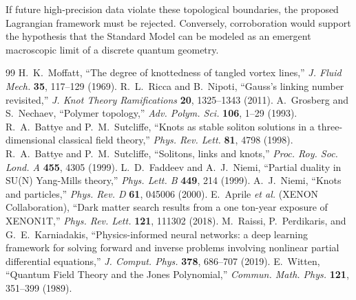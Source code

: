 \documentclass[12pt,a4paper]{article}
\begin{document}
If future high‑precision data violate these topological boundaries, the proposed Lagrangian framework must be rejected. Conversely, corroboration would support the hypothesis that the Standard Model can be modeled as an emergent macroscopic limit of a discrete quantum geometry.

\begin{thebibliography}{99}
 H.~K.~Moffatt, ``The degree of knottedness of tangled vortex lines,'' \textit{J. Fluid Mech.} \textbf{35}, 117--129 (1969).
 R.~L.~Ricca and B.~Nipoti, ``Gauss's linking number revisited,'' \textit{J. Knot Theory Ramifications} \textbf{20}, 1325--1343 (2011).
 A.~Grosberg and S.~Nechaev, ``Polymer topology,'' \textit{Adv. Polym. Sci.} \textbf{106}, 1--29 (1993).
 R.~A.~Battye and P.~M.~Sutcliffe, ``Knots as stable soliton solutions in a three-dimensional classical field theory,'' \textit{Phys. Rev. Lett.} \textbf{81}, 4798 (1998).
 R.~A.~Battye and P.~M.~Sutcliffe, ``Solitons, links and knots,'' \textit{Proc. Roy. Soc. Lond. A} \textbf{455}, 4305 (1999).
 L.~D.~Faddeev and A.~J.~Niemi, ``Partial duality in SU(N) Yang-Mills theory,'' \textit{Phys. Lett. B} \textbf{449}, 214 (1999).
 A.~J.~Niemi, ``Knots and particles,'' \textit{Phys. Rev. D} \textbf{61}, 045006 (2000).
 E.~Aprile \textit{et al.} (XENON Collaboration), ``Dark matter search results from a one ton-year exposure of XENON1T,'' \textit{Phys. Rev. Lett.} \textbf{121}, 111302 (2018).
 M.~Raissi, P.~Perdikaris, and G.~E.~Karniadakis, ``Physics-informed neural networks: a deep learning framework for solving forward and inverse problems involving nonlinear partial differential equations,'' \textit{J. Comput. Phys.} \textbf{378}, 686--707 (2019).
 E.~Witten, ``Quantum Field Theory and the Jones Polynomial,'' \textit{Commun. Math. Phys.} \textbf{121}, 351--399 (1989).
\end{thebibliography}
\end{document}
